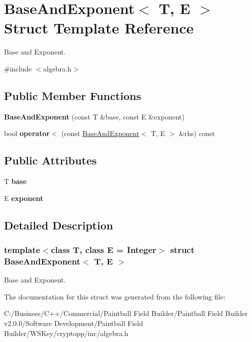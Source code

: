 \hypertarget{struct_base_and_exponent}{
\section{BaseAndExponent$<$ T, E $>$ Struct Template Reference}
\label{struct_base_and_exponent}
}


Base and Exponent.  


{\ttfamily \#include $<$algebra.h$>$}\subsection*{Public Member Functions}
\begin{DoxyCompactItemize}
\item 
\hypertarget{struct_base_and_exponent_af76c5f14b01374be99107eb11c42741b}{
{\bfseries BaseAndExponent} (const T \&base, const E \&exponent)}
\label{struct_base_and_exponent_af76c5f14b01374be99107eb11c42741b}

\item 
\hypertarget{struct_base_and_exponent_a9700baba52a0054d949a1fa816f721fb}{
bool {\bfseries operator$<$} (const \hyperlink{struct_base_and_exponent}{BaseAndExponent}$<$ T, E $>$ \&rhs) const }
\label{struct_base_and_exponent_a9700baba52a0054d949a1fa816f721fb}

\end{DoxyCompactItemize}
\subsection*{Public Attributes}
\begin{DoxyCompactItemize}
\item 
\hypertarget{struct_base_and_exponent_a2755b0083cf789f5dc529c3fb3688a5f}{
T {\bfseries base}}
\label{struct_base_and_exponent_a2755b0083cf789f5dc529c3fb3688a5f}

\item 
\hypertarget{struct_base_and_exponent_a301129e6c74f822ba4bd31a19ccabe82}{
E {\bfseries exponent}}
\label{struct_base_and_exponent_a301129e6c74f822ba4bd31a19ccabe82}

\end{DoxyCompactItemize}


\subsection{Detailed Description}
\subsubsection*{template$<$class T, class E = Integer$>$ struct BaseAndExponent$<$ T, E $>$}

Base and Exponent. 

The documentation for this struct was generated from the following file:\begin{DoxyCompactItemize}
\item 
C:/Business/C++/Commercial/Paintball Field Builder/Paintball Field Builder v2.0.0/Software Development/Paintball Field Builder/WSKey/cryptopp/inc/algebra.h\end{DoxyCompactItemize}
